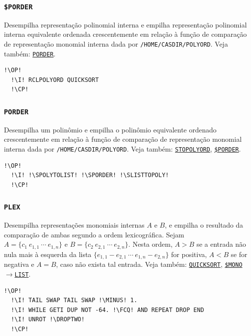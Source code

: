 \documentclass[12pt,a4paper]{report}
\newcommand{\kwd}[1]{\texttt{\textcolor{keyword}{#1}}}
\newcommand{\I}{\enspace\textcolor{indent}\vrule\hspace{2pt}}
\newcommand{\DROPTWO}{\kwd{DROP2}}   %
\newcommand{\MINUS}{\kwd{-}}   %
\newcommand{\FCQ}{\kwd{FC?}} %
\newcommand{\QUICKSORT}{\kwd{QUICKSORT}}   %
\newcommand{\STOPOLYORD}{\kwd{STOPOLYORD}}   %
\newcommand{\PLEX}{\kwd{PLEX}}   %
\newcommand{\SPOLYTOLIST}{\kwd{\$POLY{$\rightarrow$}LIST}}   %
\newcommand{\SLISTTOPOLY}{\kwd{\$LIST{$\rightarrow$}POLY}}   %
\newcommand{\SMONOTOLIST}{\kwd{\$MONO{$\rightarrow$}LIST}}   %
\newcommand{\PORDER}{\kwd{PORDER}}   %
\newcommand{\SPORDER}{\kwd{\$PORDER}}   %
\newcommand{\OP}{\kwd{$\ll$}}   %
\newcommand{\CP}{\kwd{$\gg$}}   %
\numberwithin{theorem}{chapter}
\begin{document}
\subsubsection{\SPORDER}\label{SPORDER}
Desempilha representação polinomial interna e empilha representação
polinomial interna equivalente ordenada crescentemente em relação à
função de comparação de representação monomial interna dada por
\texttt{/HOME/CASDIR/POLYORD}.  Veja também:
\hyperref[PORDER]{\PORDER}.
\begin{lstlisting}[language=userrpl]
  !\OP!
  !\I! RCLPOLYORD QUICKSORT
  !\CP!
\end{lstlisting}

\subsubsection{\PORDER}\label{PORDER}
Desempilha um polinômio e empilha o polinômio equivalente ordenado
crescentemente em relação à função de comparação de representação
monomial interna dada por \texttt{/HOME/CASDIR/POLYORD}.  Veja também:
\hyperref[STOPOLYORD]{\STOPOLYORD}, \hyperref[$PORDER]{\SPORDER}.
\begin{lstlisting}[language=userrpl]
  !\OP!
  !\I! !\SPOLYTOLIST! !\SPORDER! !\SLISTTOPOLY!
  !\CP!
\end{lstlisting}

\subsubsection{\PLEX}\label{PLEX}
Desempilha representações monomiais internas \(A\) e \(B\), e empilha
o resultado da comparação de ambas segundo a ordem lexicográfica.
Sejam \\ \(A = \{c_1\ e_{1,1}\ \cdots\ e_{1,n}\}\) e \(B =
\{c_2\ e_{2,1}\ \cdots\ e_{2,n}\}\).  Nesta ordem, \(A > B\) se a
entrada não nula mais à esquerda da lista
\(\{e_{1,1}-e_{2,1}\ \cdots\ e_{1,n}-e_{2,n}\}\) for positiva, \(A <
B\) se for negativa e \(A = B\), caso não exista tal entrada.  Veja
também: \hyperref[QUICKSORT]{\QUICKSORT},
\hyperref[SMONOTOLIST]{\SMONOTOLIST}.
\begin{lstlisting}[language=userrpl]
  !\OP!
  !\I! TAIL SWAP TAIL SWAP !\MINUS! 1.
  !\I! WHILE GETI DUP NOT -64. !\FCQ! AND REPEAT DROP END
  !\I! UNROT !\DROPTWO!
  !\CP!
\end{lstlisting}
\end{document}
